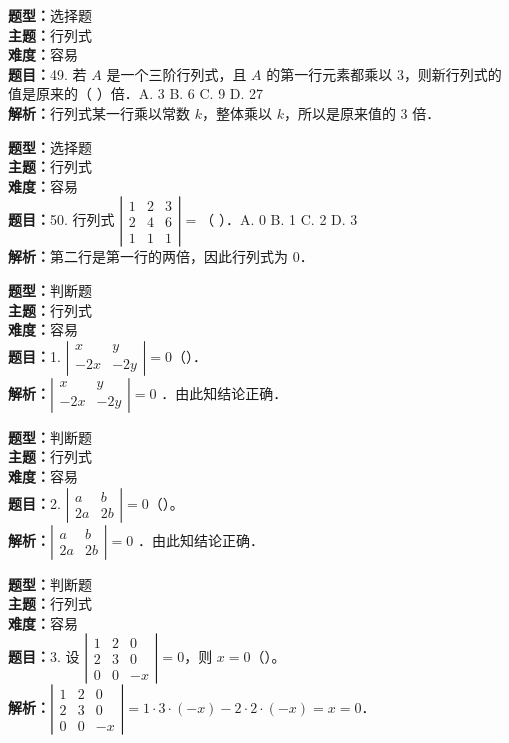 \documentclass{ctexart}
\newenvironment{question}[5]{%
	\noindent\textbf{题型：}#1\\
	\textbf{主题：}#2\\
	\textbf{难度：}#3\\
	\textbf{题目：}#4\\
	\textbf{解析：}#5\\
	\vspace{1em}
}{}
\begin{document}
\begin{question}
	{选择题}
	{行列式}
	{容易}
	{49. 若 $A$ 是一个三阶行列式，且 $A$ 的第一行元素都乘以 $3$，则新行列式的值是原来的（ ）倍．A. 3 B. 6 C. 9 D. 27}
	{行列式某一行乘以常数 $k$，整体乘以 $k$，所以是原来值的 3 倍．}
\end{question}

\begin{question}
	{选择题}
	{行列式}
	{容易}
	{50. 行列式 $\left|\begin{array}{ccc}1 & 2 & 3 \\ 2 & 4 & 6 \\ 1 & 1 & 1\end{array}\right|=$（ ）．A. 0 B. 1 C. 2 D. 3}
	{第二行是第一行的两倍，因此行列式为 0．}
\end{question}
\newpage
\begin{question}
	{判断题}
	{行列式}
	{容易}
	{1. $\left|\begin{array}{cc}x & y \\ -2 x & -2 y\end{array}\right|=0$（）．}
	{$\left|\begin{array}{cc}x & y \\ -2 x & -2 y\end{array}\right|=0$ ．由此知结论正确．}
\end{question}

\begin{question}
	{判断题}
	{行列式}
	{容易}
	{2. $\left|\begin{array}{cc}a & b \\ 2 a & 2 b\end{array}\right|=0$（）。}
	{$\left|\begin{array}{cc}a & b \\ 2 a & 2 b\end{array}\right|=0$ ．由此知结论正确．}
\end{question}

\begin{question}
	{判断题}
	{行列式}
	{容易}
	{3. 设 $\left|\begin{array}{ccc}1 & 2 & 0 \\ 2 & 3 & 0 \\ 0 & 0 & -x\end{array}\right|=0$，则 $x=0$（）。}
	{$\left|\begin{array}{ccc}1 & 2 & 0 \\ 2 & 3 & 0 \\ 0 & 0 & -x\end{array}\right|=1 \cdot 3 \cdot(-x) - 2 \cdot 2 \cdot(-x)=x=0$．}
\end{question}
\end{document}
